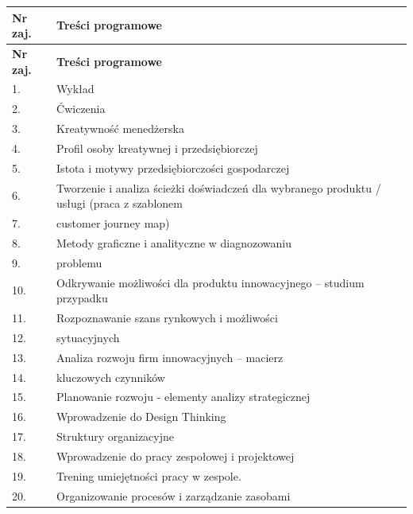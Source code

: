 \documentclass[12pt, a4paper]{article}
\newcommand{\thdrule}{\noalign{\global\setlength{\extrarowheight}{0pt}}}
\newcommand{\thdend}{\noalign{\global\setlength{\extrarowheight}{3pt}}}
\begin{document}
{\scriptsize
\begin{longtable}{m{1.5cm}m{14.5cm}}
\thdrule\toprule
\rowcolor{pjatkRed} {\color{white}\textbf{Nr zaj.}} & {\color{white}\textbf{Treści programowe}} \\
\midrule\thdend
\endfirsthead
\thdrule\toprule
\rowcolor{pjatkRed} {\color{white}\textbf{Nr zaj.}} & {\color{white}\textbf{Treści programowe}} \\
\midrule\thdend
\endhead
  \rowcolor{tableRowLight} 1. & Wykład \\
  \rowcolor{tableRowAlt} 2. & Ćwiczenia \\
  \rowcolor{tableRowLight} 3. & Kreatywność menedżerska \\
  \rowcolor{tableRowAlt} 4. & Profil osoby kreatywnej i przedsiębiorczej \\
  \rowcolor{tableRowLight} 5. & Istota i motywy przedsiębiorczości gospodarczej \\
  \rowcolor{tableRowAlt} 6. & Tworzenie i analiza ścieżki doświadczeń dla wybranego produktu / usługi (praca z szablonem \\
  \rowcolor{tableRowLight} 7. & customer journey map) \\
  \rowcolor{tableRowAlt} 8. & Metody graficzne i analityczne w diagnozowaniu \\
  \rowcolor{tableRowLight} 9. & problemu \\
  \rowcolor{tableRowAlt} 10. & Odkrywanie możliwości dla produktu innowacyjnego – studium przypadku \\
  \rowcolor{tableRowLight} 11. & Rozpoznawanie szans rynkowych i możliwości \\
  \rowcolor{tableRowAlt} 12. & sytuacyjnych \\
  \rowcolor{tableRowLight} 13. & Analiza rozwoju firm innowacyjnych – macierz \\
  \rowcolor{tableRowAlt} 14. & kluczowych czynników \\
  \rowcolor{tableRowLight} 15. & Planowanie rozwoju - elementy analizy strategicznej \\
  \rowcolor{tableRowAlt} 16. & Wprowadzenie do Design Thinking \\
  \rowcolor{tableRowLight} 17. & Struktury organizacyjne \\
  \rowcolor{tableRowAlt} 18. & Wprowadzenie do pracy zespołowej i projektowej \\
  \rowcolor{tableRowLight} 19. & Trening umiejętności pracy w zespole. \\
  \rowcolor{tableRowAlt} 20. & Organizowanie procesów i zarządzanie zasobami \\

\end{longtable}}
\end{document}
